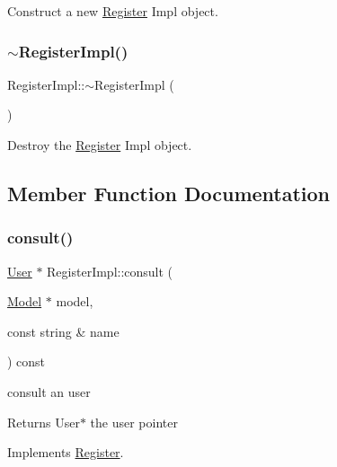 Construct a new \hyperlink{classRegister}{Register} Impl object. 

\mbox{\label{classRegisterImpl_ab227f612d7fdd113cab53c9559b0c8f9}} 
\subsubsection{\texorpdfstring{$\sim$\+Register\+Impl()}{~RegisterImpl()}}
{\footnotesize\ttfamily Register\+Impl\+::$\sim$\+Register\+Impl (\begin{DoxyParamCaption}{ }\end{DoxyParamCaption})}



Destroy the \hyperlink{classRegister}{Register} Impl object. 



\subsection{Member Function Documentation}
\mbox{\label{classRegisterImpl_afe762d2896bb50b551e7b317c4936ac3}} 
\subsubsection{\texorpdfstring{consult()}{consult()}}
{\footnotesize\ttfamily \hyperlink{classUser}{User} $\ast$ Register\+Impl\+::consult (\begin{DoxyParamCaption}\item[{\hyperlink{classModel}{Model} $\ast$}]{model,  }\item[{const string \&}]{name }\end{DoxyParamCaption}) const\hspace{0.3cm}{\ttfamily [virtual]}}



consult an user 

\begin{DoxyReturn}{Returns}
User$\ast$ the user pointer 
\end{DoxyReturn}


Implements \hyperlink{classRegister_ae1cb0de5f04828c81d2dbad9650e1d6f}{Register}.

